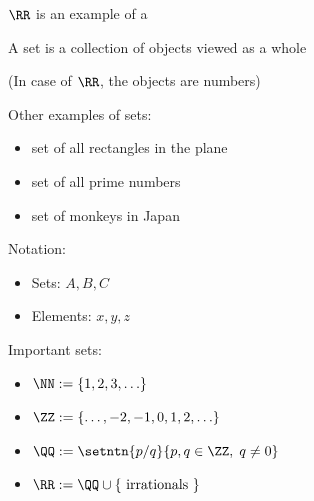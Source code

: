 \begin{frame}
    
    $\RR$ is an example of a 
    
    A set is a collection of objects viewed as a whole
    
    (In case of $\RR$, the objects are numbers)  

    \vspace{1em}
    
    Other examples of sets:

    \begin{itemize}
        \item set of all rectangles in the plane
        \vspace{1em}
        \item set of all prime numbers
        \vspace{1em}
        \item set of monkeys in Japan
    \end{itemize}

\end{frame}



\begin{frame}
    
    Notation: 
    
    \begin{itemize}
        \item Sets: $A, B, C$
        \item Elements: $x,y,z$
    \end{itemize}


    \vspace{1em}

    Important sets: 

    \begin{itemize}
        \item $\NN := \{1, 2, 3, \ldots \}$
        \vspace{0.5em}
        \item $\ZZ := \{\ldots, -2, -1, 0, 1, 2, \ldots \}$
        \vspace{0.5em}
        \item $\QQ := \setntn{p/q}{p, q \in \ZZ, \; q \not= 0}$
        \vspace{0.5em}
        \item $\RR := \QQ \cup \{ \text{ irrationals } \}$
    \end{itemize}

\end{frame}



